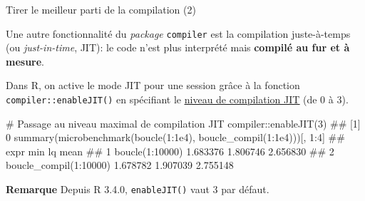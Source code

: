 \documentclass[12pt,handout,ignorenonframetext,]{beamer}
\newenvironment{Shaded}{}{}
\newcommand{\KeywordTok}[1]{\textcolor[rgb]{0.00,0.00,1.00}{#1}}
\newcommand{\DecValTok}[1]{#1}
\newcommand{\FloatTok}[1]{#1}
\newcommand{\CommentTok}[1]{\textcolor[rgb]{0.00,0.50,0.00}{#1}}
\newcommand{\OperatorTok}[1]{#1}
\newcommand{\NormalTok}[1]{#1}
\renewenvironment{Shaded}{\begin{snugshade}}{\end{snugshade}}
\begin{document}
\begin{frame}[fragile]{Tirer le meilleur parti de la compilation (2)}

Une autre fonctionnalité du \emph{package} \texttt{compiler} est la
compilation \og juste-à-temps \fg{} (ou \textit{just-in-time}, JIT): le
code n'est plus interprété mais \textbf{compilé au fur et à mesure}.

\bigskip \pause Dans R, on active le mode JIT pour une session grâce à
la fonction \texttt{compiler::enableJIT()} en spécifiant le
\href{https://stat.ethz.ch/R-manual/R-devel/library/compiler/html/compile.html}{\underline{niveau de compilation JIT}}
(de 0 à 3).

\pause \footnotesize

\begin{Shaded}
\begin{Highlighting}[]
\CommentTok{# Passage au niveau maximal de compilation JIT}
\NormalTok{compiler}\OperatorTok{::}\KeywordTok{enableJIT}\NormalTok{(}\DecValTok{3}\NormalTok{)}
\NormalTok{  ## [1] 0}
\KeywordTok{summary}\NormalTok{(}\KeywordTok{microbenchmark}\NormalTok{(}\KeywordTok{boucle}\NormalTok{(}\DecValTok{1}\OperatorTok{:}\FloatTok{1e4}\NormalTok{), }\KeywordTok{boucle_compil}\NormalTok{(}\DecValTok{1}\OperatorTok{:}\FloatTok{1e4}\NormalTok{)))[, }\DecValTok{1}\OperatorTok{:}\DecValTok{4}\NormalTok{]}
\NormalTok{  ##                     expr      min       lq     mean}
\NormalTok{  ## 1        boucle(1:10000) 1.683376 1.806746 2.656830}
\NormalTok{  ## 2 boucle_compil(1:10000) 1.678782 1.907039 2.755148}
\end{Highlighting}
\end{Shaded}

\pause \small \textbf{Remarque} Depuis R 3.4.0, \texttt{enableJIT()}
vaut 3 par défaut.

\end{frame}
\end{document}
